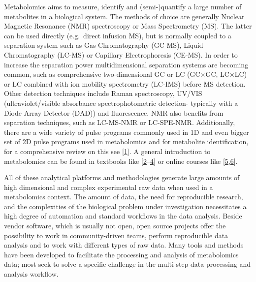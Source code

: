 \documentclass[]{article}
\begin{document}
Metabolomics aims to measure, identify and (semi-)quantify a large number of metabolites in a biological system. The methods of choice are generally Nuclear Magnetic Resonance (NMR) spectroscopy or Mass Spectrometry (MS). The latter can be used directly (e.g.~direct infusion MS), but is normally coupled to a separation system such as Gas Chromatography (GC-MS), Liquid Chromatography (LC-MS) or Capillary Electrophoresis (CE-MS). In order to increase the separation power multidimensional separation systems are becoming common, such as comprehensive two-dimensional GC or LC (GC×GC, LC×LC) or LC combined with ion mobility spectrometry (LC-IMS) before MS detection. Other detection techniques include Raman spectroscopy, UV/VIS (ultraviolet/visible absorbance spectrophotometric detection- typically with a Diode Array Detector (DAD)) and fluorescence. NMR also benefits from separation techniques, such as LC-MS-NMR or LC-SPE-NMR. Additionally, there are a wide variety of pulse programs commonly used in 1D and even bigger set of 2D pulse programs used in metabolomics and for metabolite identification, for a comprehensive review on this see {[}\protect\hyperlink{ref-emwas_2019}{1}{]}. A general introduction to metabolomics can be found in textbooks like {[}\protect\hyperlink{ref-lammerhofer_2013}{2}--\protect\hyperlink{ref-wehrens_2019}{4}{]} or online courses like {[}\protect\hyperlink{ref-InternationalMetabolomicsSociety_2019}{5},\protect\hyperlink{ref-salek_website_nd}{6}{]}.

All of these analytical platforms and methodologies generate large amounts of high dimensional and complex experimental raw data when used in a metabolomics context. The amount of data, the need for reproducible research, and the complexities of the biological problem under investigation necessitates a high degree of automation and standard workflows in the data analysis. Beside vendor software, which is usually not open, open source projects offer the possibility to work in community-driven teams, perform reproducible data analysis and to work with different types of raw data. Many tools and methods have been developed to facilitate the processing and analysis of metabolomics data; most seek to solve a specific challenge in the multi-step data processing and analysis workflow.
\end{document}
